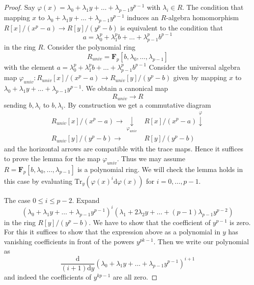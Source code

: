 \begin{proof}
Say $\varphi(x) = \lambda_0 + \lambda_1 y + \ldots + \lambda_{p - 1}y^{p - 1}$
with $\lambda_i \in R$. The condition that mapping $x$ to
$\lambda_0 + \lambda_1 y + \ldots + \lambda_{p - 1}y^{p - 1}$
induces an $R$-algebra homomorphism $R[x]/(x^p - a) \to R[y]/(y^p - b)$
is equivalent to the condition that
$$
a = \lambda_0^p + \lambda_1^p b + \ldots + \lambda_{p - 1}^pb^{p - 1}
$$
in the ring $R$. Consider the polynomial ring
$$
R_{univ} = \mathbf{F}_p[b, \lambda_0, \ldots, \lambda_{p - 1}]
$$
with the element
$a = \lambda_0^p + \lambda_1^p b + \ldots + \lambda_{p - 1}^pb^{p - 1}$
Consider the universal algebra map
$\varphi_{univ} : R_{univ}[x]/(x^p - a) \to R_{univ}[y]/(y^p - b)$
given by mapping $x$ to
$\lambda_0 + \lambda_1 y + \ldots + \lambda_{p - 1}y^{p - 1}$.
We obtain a canonical map
$$
R_{univ} \longrightarrow R
$$
sending $b, \lambda_i$ to $b, \lambda_i$. By construction we get a
commutative diagram
$$
\begin{array}{cc}R_{univ}[x]/(x^p - a) \longrightarrow\underset{\varphi_{univ}}{\downarrow} & R[x]/(x^p - a) \overset{\varphi}{\downarrow} \\ R_{univ}[y]/(y^p - b) \longrightarrow & R[y]/(y^p - b)\end{array}
$$
and the horizontal arrows are compatible with the trace maps. Hence it
suffices to prove the lemma for the map $\varphi_{univ}$. Thus we may
assume $R = \mathbf{F}_p[b, \lambda_0, \ldots, \lambda_{p - 1}]$
is a polynomial ring. We will check the lemma holds in this case
by evaluating
$\text{Tr}_y(\varphi(x)^i\text{d}\varphi(x))$ for $i = 0 , \ldots, p - 1$.

\medskip\noindent
The case $0 \leq i \leq p - 2$. Expand
$$
(\lambda_0 + \lambda_1 y + \ldots + \lambda_{p - 1}y^{p - 1})^i
(\lambda_1 + 2 \lambda_2 y + \ldots + (p - 1)\lambda_{p - 1}y^{p - 2})
$$
in the ring $R[y]/(y^p - b)$. We have to show that the coefficient
of $y^{p - 1}$ is zero. For this it suffices to show that
the expression above as a polynomial in $y$ has vanishing
coefficients in front of the powers $y^{pk - 1}$.
Then we write our polynomial as
$$
\frac{\text{d}}{(i + 1)\text{d}y}
(\lambda_0 + \lambda_1 y + \ldots + \lambda_{p - 1}y^{p - 1})^{i + 1}
$$
and indeed the coefficients of $y^{kp - 1}$ are all zero.


\end{proof}
